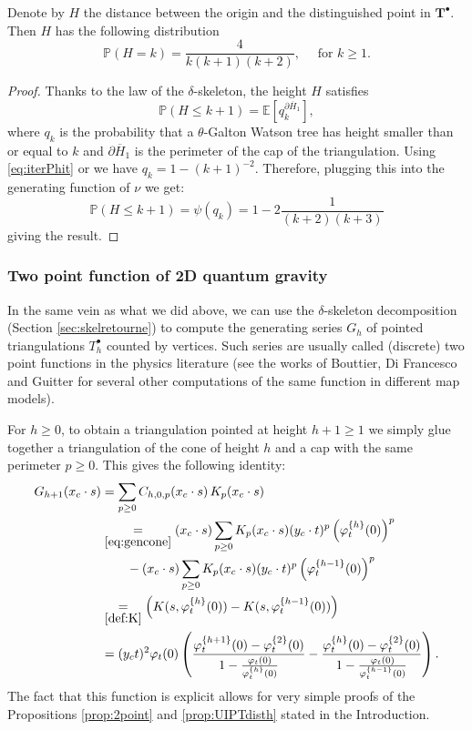 \documentclass[10pt]{amsart}
\theoremstyle{definition}\newtheorem{defi}[theo]{Definition}\newtheorem{rema}[theo]{Remark}\newtheorem{exam}[theo]{Example}\newtheorem{exem}[theo]{Example}\newtheorem{nota}[theo]{Notation}
\begin{document}
\begin{corollary} Denote by $H$ the distance between the origin and the distinguished point in $ \mathbf{T}^{\bullet}$. Then $H$ has the following distribution
$$ \mathbb{P}(H=k) = \frac{4}{k(k+1)(k+2)}, \quad \mbox{ for } k \geq 1. $$
\end{corollary}
\begin{proof}
Thanks to the law of the $\delta$-skeleton, the height $H$ satisfies
$$ \mathbb{P}( H \leq k+1) = \mathbb{E}[q_{k}^{\partial \overline{H}_{1}}],$$
where $q_{k}$ is the probability that a $\theta$-Galton Watson tree has height smaller than or equal to $k$ and $\partial \overline{H}_{1}$ is the perimeter of the cap of the triangulation. Using \eqref{eq:iterPhit} or \cite[Eq (28)]{CLGfpp} we have $q_{k} = 1-(k+1)^{-2}$. Therefore, plugging this into the generating function of $\nu$ we get:
\[
\mathbb{P}( H \leq k+1) = \psi(q_k) = 1 - 2 \frac{1}{(k+2)(k+3)}
\]
giving the result.
\end{proof}

\subsubsection{Two point function of 2D quantum gravity}
\label{sec:2point}
In the same vein as what we did above, we can use the $\delta$-skeleton decomposition (Section \ref{sec:skelretourne}) to compute the generating series $G_h$ of pointed triangulations $T^{\bullet}_{h}$ counted by vertices. Such series are usually called (discrete) two point functions in the physics literature (see the works of Bouttier, Di Francesco and Guitter \cite{BDFG03,BG12,G17} for several other computations of the same function in different map models).


For $h \geq 0$, to obtain a triangulation pointed at height $h + 1 \geq 1$ we simply glue together a triangulation of the cone of height $h$ and a cap with the same perimeter $p \geq 0$. This gives the following identity:
\begin{align}
G_{h+1}(x_c \cdot s) &= \sum_{p\geq 0} C_{h,0,p}(x_c \cdot s) \, K_p(x_c \cdot s)\nonumber \\
& \underset{ \eqref{eq:gencone}}{=}
(x_c \cdot s) \sum_{p\geq 0} K_p(x_c \cdot s)  (y_c \cdot t)^{p} \left(\varphi_t^{\{h\}} (0) \right)^p \nonumber\\
& \qquad -
(x_c \cdot s) \sum_{p\geq 0} K_p(x_c \cdot s)
 (y_c \cdot t)^{p} \left(\varphi_t^{\{h-1\}} (0) \right)^p
\nonumber \\
&\underset{ \eqref{def:K}}{=} \left( K(s, \varphi_t^{\{h\}}(0)) -  K(s, \varphi_t^{\{h-1\}}(0)) \right)\nonumber \\
& = ( y_c t )^2 \varphi_t(0) \left(
\frac{
\varphi_t^{\{h+1\} }(0)
- \varphi^{\{2\}}_t(0)
}
{
1-
\frac{\varphi_t(0)}{\varphi_t^{\{h\}}(0)}
}
-
\frac{
\varphi_t^{\{h\}}(0)
- \varphi^{\{2\}}_t(0)
}
{
1-
\frac{\varphi_t(0)}{\varphi_t^{\{h-1\}}(0)}
}
\right). \label{eq:gcexact}
\end{align}
The fact that this function is explicit allows for very simple proofs of the Propositions \ref{prop:2point} and \ref{prop:UIPTdisth} stated in the Introduction.
\end{document}
